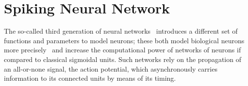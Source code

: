 %

\section{Spiking Neural Network}
\label{sec:SNNintro}
The so-called third generation of neural networks~\cite{maass1997networks} introduces a different set of functions and parameters to model neurons;
these both model biological neurons more precisely~\cite{hodgkin1952quantitative} and increase the computational power of networks of neurons if compared to classical sigmoidal units.
Such networks rely on the propagation of an all-or-none signal, the action potential, which asynchronously carries information to its connected units by means of its timing.
